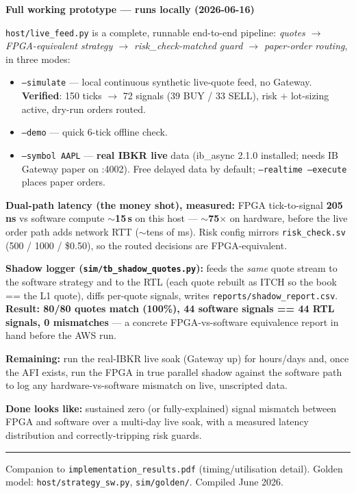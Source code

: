 \documentclass[10pt,a4paper]{article}
\begin{document}
\begin{keybox}
{\bfseries\color{newtext} Full working prototype — runs locally (2026-06-16)}

\smallskip
\texttt{host/live\_feed.py} is a complete, runnable end-to-end pipeline:
\emph{quotes $\to$ FPGA-equivalent strategy $\to$ risk\_check-matched guard $\to$
paper-order routing}, in three modes:
\begin{itemize}[leftmargin=1.2em, itemsep=2pt]
  \item \texttt{--simulate} — local continuous synthetic live-quote feed, no
        Gateway. \textbf{Verified}: 150 ticks $\to$ 72 signals (39 BUY / 33 SELL),
        risk + lot-sizing active, dry-run orders routed.
  \item \texttt{--demo} — quick 6-tick offline check.
  \item \texttt{--symbol AAPL} — \textbf{real IBKR live} data (ib\_async 2.1.0
        installed; needs IB Gateway paper on :4002). Free delayed data by default;
        \texttt{--realtime --execute} places paper orders.
\end{itemize}
\textbf{Dual-path latency (the money shot), measured:} FPGA tick-to-signal
\textbf{205\,ns} vs software compute \textbf{$\sim$15\,\textmu s} on this host —
$\sim$\textbf{75$\times$} on hardware, before the live order path adds network RTT
($\sim$tens of ms). Risk config mirrors \texttt{risk\_check.sv}
(500 / 1000 / \$0.50), so the routed decisions are FPGA-equivalent.

\smallskip
\textbf{Shadow logger (\texttt{sim/tb\_shadow\_quotes.py}):} feeds the \emph{same}
quote stream to the software strategy and to the RTL (each quote rebuilt as ITCH
so the book == the L1 quote), diffs per-quote signals, writes
\texttt{reports/shadow\_report.csv}. \textcolor{okgreen}{\textbf{Result: 80/80
quotes match (100\%), 44 software signals == 44 RTL signals, 0 mismatches}} —
a concrete FPGA-vs-software equivalence report in hand before the AWS run.
\end{keybox}

\textbf{Remaining:} run the real-IBKR live soak (Gateway up) for hours/days and,
once the AFI exists, run the FPGA in true parallel shadow against the software
path to log any hardware-vs-software mismatch on live, unscripted data.

\textbf{Done looks like:} sustained zero (or fully-explained) signal mismatch
between FPGA and software over a multi-day live soak, with a measured latency
distribution and correctly-tripping risk guards.

\vfill
\textcolor{rulegray}{\rule{\linewidth}{0.5pt}}
{\footnotesize\color{rulegray}
Companion to \texttt{implementation\_results.pdf} (timing/utilisation detail).
Golden model: \texttt{host/strategy\_sw.py}, \texttt{sim/golden/}. Compiled June 2026.}
\end{document}
